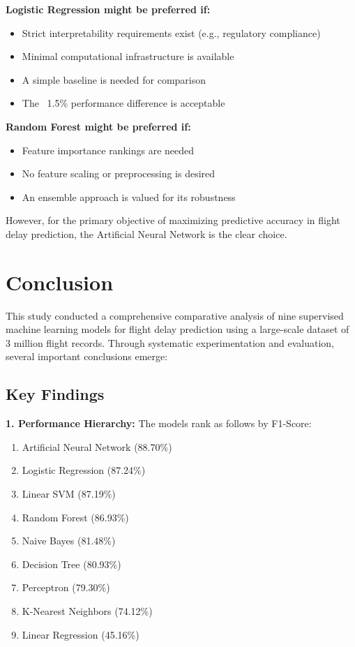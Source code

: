 \documentclass[sigconf]{acmart}
\begin{document}
\textbf{Logistic Regression might be preferred if:}
\begin{itemize}
    \item Strict interpretability requirements exist (e.g., regulatory compliance)
    \item Minimal computational infrastructure is available
    \item A simple baseline is needed for comparison
    \item The ~1.5\% performance difference is acceptable
\end{itemize}

\textbf{Random Forest might be preferred if:}
\begin{itemize}
    \item Feature importance rankings are needed
    \item No feature scaling or preprocessing is desired
    \item An ensemble approach is valued for its robustness
\end{itemize}

However, for the primary objective of maximizing predictive accuracy in flight delay prediction, the Artificial Neural Network is the clear choice.

\section{Conclusion}

This study conducted a comprehensive comparative analysis of nine supervised machine learning models for flight delay prediction using a large-scale dataset of 3 million flight records. Through systematic experimentation and evaluation, several important conclusions emerge:

\subsection{Key Findings}

\textbf{1. Performance Hierarchy:} The models rank as follows by F1-Score:
\begin{enumerate}
    \item Artificial Neural Network (88.70\%)
    \item Logistic Regression (87.24\%)
    \item Linear SVM (87.19\%)
    \item Random Forest (86.93\%)
    \item Naive Bayes (81.48\%)
    \item Decision Tree (80.93\%)
    \item Perceptron (79.30\%)
    \item K-Nearest Neighbors (74.12\%)
    \item Linear Regression (45.16\%)
\end{enumerate}
\end{document}
